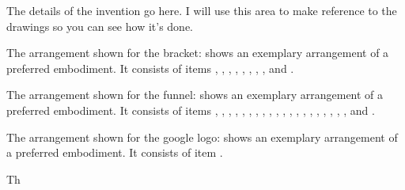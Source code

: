
\npar The details of the invention go here. I will use this area to make reference to the drawings so you can see how it's done. 

\npar The arrangement shown for the bracket:  shows an 
exemplary arrangement of a preferred embodiment. It consists of items
, , , , 
, , , , and .


\npar The arrangement shown for the funnel:  shows an 
exemplary arrangement of a preferred embodiment. It consists of items
, , , , 
, , , ,  
, , , ,  
, , , ,  
, , , , and .

\npar The arrangement shown for the google logo:  shows an 
exemplary arrangement of a preferred embodiment. It consists of item
.


Th